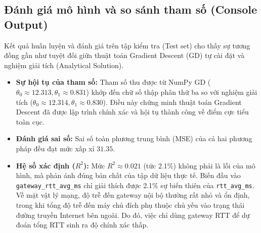 \subsection{Đánh giá mô hình và so sánh tham số (Console Output)}
Kết quả huấn luyện và đánh giá trên tập kiểm tra (Test set) cho thấy sự tương đồng gần như tuyệt đối giữa thuật toán Gradient Descent (GD) tự cài đặt và nghiệm giải tích (Analytical Solution).
\begin{itemize}
    \item \textbf{Sự hội tụ của tham số:} Tham số thu được từ NumPy GD ($\theta_0 \approx 12.313, \theta_1 \approx 0.831$) khớp đến chữ số thập phân thứ ba so với nghiệm giải tích ($\theta_0 \approx 12.314, \theta_1 \approx 0.830$). Điều này chứng minh thuật toán Gradient Descent đã được lập trình chính xác và hội tụ thành công về điểm cực tiểu toàn cục.
    \item \textbf{Đánh giá sai số:} Sai số toàn phương trung bình (MSE) của cả hai phương pháp đều đạt mức xấp xỉ $31.35$.
    \item \textbf{Hệ số xác định ($R^2$):} Mức $R^2 \approx 0.021$ (tức 2.1\%) không phải là lỗi của mô hình, mà phản ánh đúng bản chất của tập dữ liệu thực tế. Biến đầu vào \texttt{gateway\_rtt\_avg\_ms} chỉ giải thích được 2.1\% sự biến thiên của \texttt{rtt\_avg\_ms}. Về mặt vật lý mạng, độ trễ đến gateway nội bộ thường rất nhỏ và ổn định, trong khi tổng độ trễ đến máy chủ đích phụ thuộc chủ yếu vào trạng thái đường truyền Internet bên ngoài. Do đó, việc chỉ dùng gateway RTT để dự đoán tổng RTT sinh ra độ chính xác thấp.
\end{itemize}

